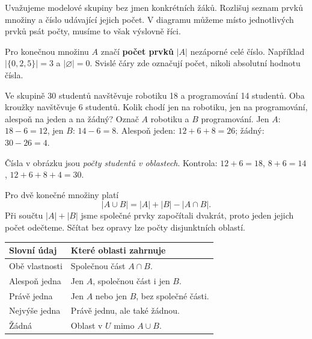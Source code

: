 \documentclass[11pt,a4paper]{article}
\begin{document}
Uvažujeme modelové skupiny bez jmen konkrétních žáků.
Rozlišuj seznam prvků množiny a číslo udávající jejich počet.
V diagramu můžeme místo jednotlivých prvků psát počty, musíme to však výslovně říci.
\begin{definiceBox}
Pro konečnou množinu $A$ značí \textbf{počet prvků} $|A|$ nezáporné celé číslo.
Například $|\{0,2,5\}|=3$ a $|\varnothing|=0$.
Svislé čáry zde označují počet, nikoli absolutní hodnotu čísla.
\end{definiceBox}

\begin{prikladReseniBox}[title={P1: dva kroužky},breakable=false]
Ve skupině 30 studentů navštěvuje robotiku 18 a programování 14 studentů.
Oba kroužky navštěvuje 6 studentů. Kolik chodí jen na robotiku,
jen na programování, alespoň na jeden a na žádný?
\tcblower
Označ $A$ robotiku a $B$ programování.
Jen $A$: $18-6=12$, jen $B$: $14-6=8$.
Alespoň jeden: $12+6+8=26$; žádný: $30-26=4$.
\begin{center}
\end{center}
Čísla v obrázku jsou \emph{počty studentů v oblastech}.
Kontrola: $12+6=18$, $8+6=14$, $12+6+8+4=30$.
\end{prikladReseniBox}

Pro dvě konečné množiny platí
\[
|A\cup B|=|A|+|B|-|A\cap B|.
\]
Při součtu $|A|+|B|$ jsme společné prvky započítali dvakrát, proto jeden
jejich počet odečteme. Sčítat bez opravy lze počty disjunktních oblastí.

\begin{center}
\begin{tabularx}{\linewidth}{@{}l X@{}}
\toprule
Slovní údaj & Které oblasti zahrnuje \\ \midrule
Obě vlastnosti & Společnou část $A\cap B$.\\
Alespoň jedna & Jen $A$, společnou část i jen $B$.\\
Právě jedna & Jen $A$ nebo jen $B$, bez společné části.\\
Nejvýše jedna & Právě jednu, ale také žádnou.\\
Žádná & Oblast v $U$ mimo $A\cup B$.\\ \bottomrule
\end{tabularx}
\end{center}
\end{document}
